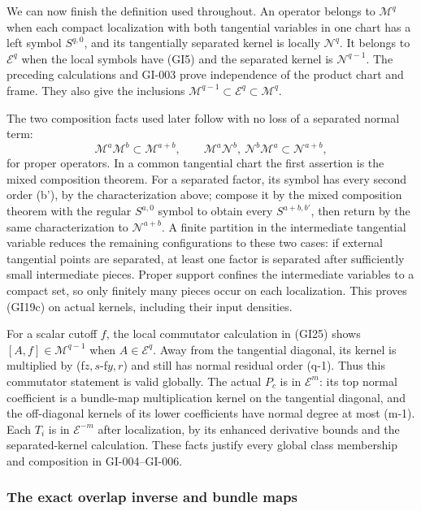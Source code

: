 \documentclass[
  11pt,
]{article}
\begin{document}
We can now finish the definition used throughout. An operator belongs to
\(\mathscr M^q\) when each compact localization with both tangential
variables in one chart has a left symbol \(S^{q,0}\), and its
tangentially separated kernel is locally \(\mathcal N^q\). It belongs to
\(\mathscr E^q\) when the local symbols have (GI5) and the separated
kernel is \(\mathcal N^{q-1}\). The preceding calculations and GI-003
prove independence of the product chart and frame. They also give the
inclusions \(\mathscr M^{q-1}\subset\mathscr E^q\subset\mathscr M^q\).

The two composition facts used later follow with no loss of a separated
normal term: \[
 \mathscr M^a\mathscr M^b\subset\mathscr M^{a+b},
 \qquad
 \mathscr M^a\mathcal N^b,\ \mathcal N^b\mathscr M^a
 \subset\mathcal N^{a+b},
 \tag{GI19c}
\] for proper operators. In a common tangential chart the first
assertion is the mixed composition theorem. For a separated factor, its
symbol has every second order (b'), by the characterization above;
compose it by the mixed composition theorem with the regular \(S^{a,0}\)
symbol to obtain every \(S^{a+b,b'}\), then return by the same
characterization to \(\mathcal N^{a+b}\). A finite partition in the
intermediate tangential variable reduces the remaining configurations to
these two cases: if external tangential points are separated, at least
one factor is separated after sufficiently small intermediate pieces.
Proper support confines the intermediate variables to a compact set, so
only finitely many pieces occur on each localization. This proves
(GI19c) on actual kernels, including their input densities.

For a scalar cutoff \(f\), the local commutator calculation in (GI25)
shows \([A,f]\in\mathscr M^{q-1}\) when \(A\in\mathscr E^q\). Away from
the tangential diagonal, its kernel is multiplied by (f\(z,s\)-f\(y,r\))
and still has normal residual order (q-1). Thus this commutator
statement is valid globally. The actual \(P_c\) is in \(\mathscr E^m\):
its top normal coefficient is a bundle-map multiplication kernel on the
tangential diagonal, and the off-diagonal kernels of its lower
coefficients have normal degree at most (m-1). Each \(T_i\) is in
\(\mathscr E^{-m}\) after localization, by its enhanced derivative
bounds and the separated-kernel calculation. These facts justify every
global class membership and composition in GI-004--GI-006.

\subsubsection{The exact overlap inverse and bundle
maps}\label{the-exact-overlap-inverse-and-bundle-maps}
\end{document}

